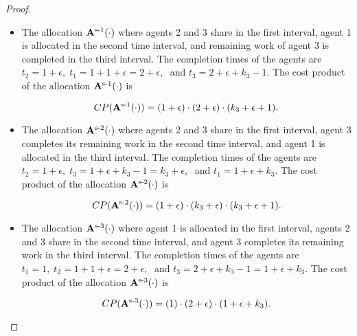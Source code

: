 \documentclass[letterpaper]{article} %
\theoremstyle{definition}
\begin{document}
\begin{proof}
\begin{itemize}
    \item The allocation $\mathbf{A}^{\textnormal{s-1}}(\cdot)$ where agents 2 and 3 share in the first interval, agent 1 is allocated in the second time interval, and remaining work of agent 3 is completed in the third interval. The completion times of the agents are $t_{2} = 1 + \epsilon, \; t_{1} = 1 + 1 + \epsilon = 2 + \epsilon, \;$ and $t_{3} = 2 + \epsilon + k_{3} - 1$. The cost product of the allocation $\mathbf{A}^{\textnormal{s-1}}(\cdot)$ is
    \begin{linenomath}
    \begin{equation*}
    CP(\mathbf{A}^{\textnormal{s-1}}(\cdot)) = (1+ \epsilon) \cdot (2 + \epsilon) \cdot (k_{3} + \epsilon + 1).
    \end{equation*}
    \end{linenomath}
    
    \item The allocation $\mathbf{A}^{\textnormal{s-2}}(\cdot)$ where agents 2 and 3 share in the first interval, agent 3 completes its remaining work in the second time interval, and agent 1 is allocated in the third interval. The completion times of the agents are $t_{2} = 1 + \epsilon, \; t_{3} = 1 + \epsilon + k_{3} - 1 = k_{3} + \epsilon, \;$ and $t_{1} = 1 + \epsilon + k_{3}$. The cost product of the allocation $\mathbf{A}^{\textnormal{s-2}}(\cdot)$ is
    \begin{linenomath}
    \begin{equation*}
    CP(\mathbf{A}^{\textnormal{s-2}}(\cdot)) = (1+ \epsilon) \cdot (k_{3} + \epsilon) \cdot (k_{3} + \epsilon + 1).     
    \end{equation*}
    \end{linenomath}
    
    \item The allocation $\mathbf{A}^{\textnormal{s-3}}(\cdot)$ where agent 1 is allocated in the first interval, agents 2 and 3 share in the second time interval, and agent 3 completes its remaining work in the third interval. The completion times of the agents are $t_{1} = 1, \; t_{2} =  1 + 1 + \epsilon = 2 + \epsilon, \;$ and $t_{3} = 2 + \epsilon + k_{3} - 1 = 1 + \epsilon + k_{3}$. The cost product of the allocation $\mathbf{A}^{\textnormal{s-3}}(\cdot)$ is
    \begin{linenomath}
    \begin{equation*}
    CP(\mathbf{A}^{\textnormal{s-3}}(\cdot)) = (1) \cdot (2 + \epsilon) \cdot (1 + \epsilon + k_{3}).     
    \end{equation*}
    \end{linenomath}
    

\end{itemize}
\end{proof}
\end{document}
